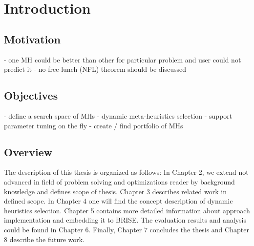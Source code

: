 \chapter{Introduction}\label{intro}

\section{Motivation}
- one MH could be better than other for particular problem and user could not predict it \cite{surv:kerschke2019automated}
- no-free-lunch (NFL) theorem should be discussed


\section{Objectives}
- define a search space of MHs - dynamic meta-heuristics selection
- support parameter tuning on the fly
- create / find portfolio of MHs

  	
\section{Overview}
The description of this thesis is organized as follows: In Chapter 2, we extend not advanced in field of problem solving and optimizations reader by background knowledge and defines scope of thesis. Chapter 3 describes related work in defined scope. In Chapter 4 one will find the concept description of dynamic heuristics selection. Chapter 5 contains more detailed information about approach implementation and  embedding it to BRISE. The evaluation results and analysis could be found in Chapter 6. Finally, Chapter 7 concludes the thesis and Chapter 8 describe the future work.
